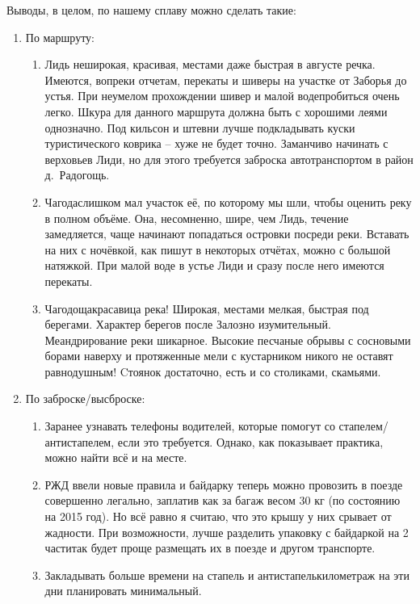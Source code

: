 Выводы, в целом, по нашему сплаву можно сделать такие:
\begin{enumerate}
	\setlength{\itemindent}{-1em}
	\item По маршруту:
	\begin{enumerate}
		\setlength{\itemindent}{0em}
		\item [$-$] Лидь неширокая, красивая, местами даже быстрая в августе речка. Имеются, вопреки отчетам, перекаты и шиверы на участке от Заборья до устья. При неумелом прохождении шивер и малой воде\mdash пробиться очень легко. Шкура для данного маршрута должна быть с хорошими леями однозначно. Под кильсон и штевни лучше подкладывать куски туристического коврика – хуже не будет точно. Заманчиво начинать с верховьев Лиди, но для этого требуется заброска автотранспортом в район д.~Радогощь.
		\item [$-$] Чагода\mdash слишком мал участок её, по которому мы шли, чтобы оценить реку в полном объёме. Она, несомненно, шире, чем Лидь, течение замедляется, чаще начинают попадаться островки посреди реки. Вставать на них с ночёвкой, как пишут в некоторых отчётах, можно с большой натяжкой. При малой воде в устье Лиди и сразу после него имеются перекаты.
		\item [$-$] Чагодоща\mdash красавица река! Широкая, местами мелкая, быстрая под берегами. Характер берегов после Залозно изумительный. Меандрирование реки шикарное. Высокие песчаные обрывы с сосновыми борами наверху и протяженные мели с кустарником никого не оставят равнодушным! Cтоянок достаточно, есть и со столиками, скамьями.
	\end{enumerate}
	\item По заброске/высброске:
		\begin{enumerate}
		\setlength{\itemindent}{0em}
		\item [$-$] Заранее узнавать телефоны водителей, которые помогут со стапелем/антистапелем, если это требуется. Однако, как показывает практика, можно найти всё и на месте.
		\item [$-$] РЖД ввели новые правила и байдарку теперь можно провозить в поезде совершенно легально, заплатив как за багаж весом 30 кг (по состоянию на 2015 год). Но всё равно я считаю, что это крышу у них срывает от жадности. При возможности, лучше разделить упаковку с байдаркой на 2 части\mdash так будет проще размещать их в поезде и другом транспорте.
		\item [$-$] Закладывать больше времени на стапель и антистапель\mdash километраж на эти дни планировать минимальный.  
	\end{enumerate}

\end{enumerate}
